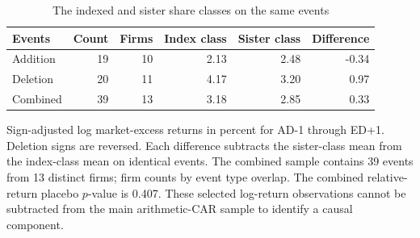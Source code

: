 \begin{table}[!htbp]
\centering
\caption{The indexed and sister share classes on the same events}\label{tab:twins}
\small
\setlength{\tabcolsep}{5pt}
\begin{tabular}{lrrrrr}
\toprule
Events & Count & Firms & Index class & Sister class & Difference \\
\midrule
Addition & 19 & 10 & 2.13 & 2.48 & -0.34 \\
Deletion & 20 & 11 & 4.17 & 3.20 & 0.97 \\
Combined & 39 & 13 & 3.18 & 2.85 & 0.33 \\
\bottomrule
\end{tabular}
\begin{minipage}{\linewidth}\footnotesize\vspace{5pt}
Sign-adjusted log market-excess returns in percent for AD-1 through ED+1. Deletion signs are reversed. Each difference subtracts the sister-class mean from the index-class mean on identical events. The combined sample contains 39 events from 13 distinct firms; firm counts by event type overlap. The combined relative-return placebo $p$-value is 0.407. These selected log-return observations cannot be subtracted from the main arithmetic-CAR sample to identify a causal component.
\end{minipage}
\end{table}

